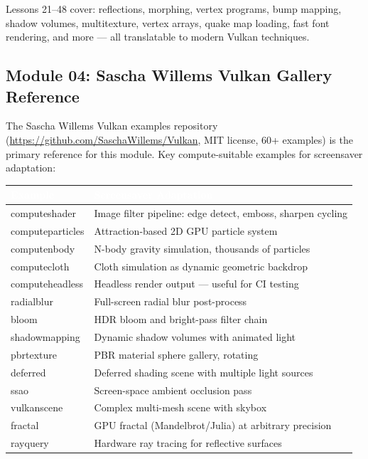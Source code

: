 \documentclass[11pt,letterpaper]{article}
\newcommand{\tableheader}[1]{\textbf{\sffamily\textcolor{white}{#1}}}
\begin{document}
Lessons 21--48 cover: reflections, morphing, vertex programs, bump mapping, shadow volumes, multitexture, vertex arrays, quake map loading, fast font rendering, and more --- all translatable to modern Vulkan techniques.

\subsection{Module 04: Sascha Willems Vulkan Gallery Reference}

The Sascha Willems Vulkan examples repository (\url{https://github.com/SaschaWillems/Vulkan}, MIT license, 60+ examples) is the primary reference for this module. Key compute-suitable examples for screensaver adaptation:

\begin{center}
\begin{tabularx}{\textwidth}{L{3.5cm}X}
\toprule
{}
\tableheader{Example} & \tableheader{Screensaver Adaptation} \\
\midrule
computeshader & Image filter pipeline: edge detect, emboss, sharpen cycling \\
computeparticles & Attraction-based 2D GPU particle system \\
computenbody & N-body gravity simulation, thousands of particles \\
computecloth & Cloth simulation as dynamic geometric backdrop \\
computeheadless & Headless render output --- useful for CI testing \\
radialblur & Full-screen radial blur post-process \\
bloom & HDR bloom and bright-pass filter chain \\
shadowmapping & Dynamic shadow volumes with animated light \\
pbrtexture & PBR material sphere gallery, rotating \\
deferred & Deferred shading scene with multiple light sources \\
ssao & Screen-space ambient occlusion pass \\
vulkanscene & Complex multi-mesh scene with skybox \\
fractal & GPU fractal (Mandelbrot/Julia) at arbitrary precision \\
rayquery & Hardware ray tracing for reflective surfaces \\
\bottomrule
\end{tabularx}
\end{center}
\end{document}
